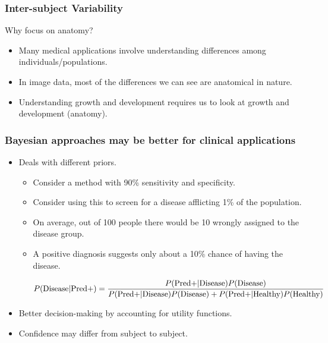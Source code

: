 \begin{frame}
\frametitle{Inter-subject Variability}
Why focus on anatomy?
\begin{itemize}
\item{Many medical applications involve understanding differences among individuals/populations.}
\item{In image data, most of the differences we can see are anatomical in nature.}
\item{Understanding growth and development requires us to look at growth and development (anatomy).}
\end{itemize}
\end{frame}


\begin{frame}
\frametitle{Bayesian approaches may be better for clinical applications}
\begin{itemize}
\item Deals with different priors.
\begin{itemize}
\item Consider a method with 90\% sensitivity and specificity.
\item Consider using this to screen for a disease afflicting 1\% of the population.
\item On average, out of 100 people there would be 10 wrongly assigned to the disease group.
\item A positive diagnosis suggests only about a 10\% chance of having the disease.
{\small
\begin{eqnarray*}
P(\text{Disease} | \text{Pred+}) & = \frac{P(\text{Pred+} | \text{Disease}) P(\text{Disease})}{P(\text{Pred+} | \text{Disease}) P(\text{Disease}) + P(\text{Pred+} | \text{Healthy}) P(\text{Healthy})}\cr
\end{eqnarray*}
\par
}
\end{itemize}
\item Better decision-making by accounting for utility functions.
\item Confidence may differ from subject to subject.
\end{itemize}
\end{frame}


